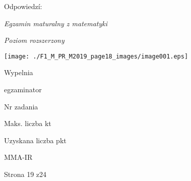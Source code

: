 \documentclass[a4paper,12pt]{article}
\begin{document}
Odpowiedzí:

{\it Egzamin maturalny z matematyki}

{\it Poziom rozszerzony}
\begin{center}
\texttt{[image: ./F1\_M\_PR\_M2019\_page18\_images/image001.eps]}
\end{center}
Wypelnia

egzaminator

Nr zadania

Maks. liczba kt

Uzyskana liczba pkt

MMA-IR

Strona 19 z24
\end{document}
